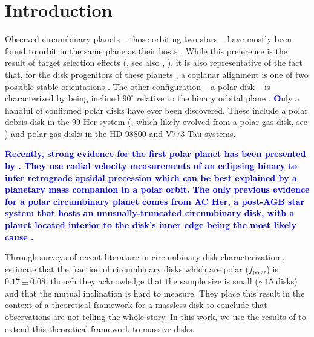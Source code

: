 \documentclass[twocolumn,linenumbers]{aastex631}
\newcommand{\RR}[1]{\textcolor{blue}{\bf#1}} %
\begin{document}

\section{Introduction}
\label{sec:intro}


Observed circumbinary planets -- those orbiting two stars -- have mostly been found to orbit in the same plane as their hosts \citep{doyle2011,orosz2012,welsh2012}. While this preference is the result of target selection effects (\citealt{martin2014}, see also \citealt{martin2015}, \citealt{martin2017a}), it is also representative of the fact that, for the disk progenitors of these planets \citep[from which the planets inherit orbital parameters, see][]{childs2021}, a coplanar alignment is one of two possible stable orientations \citep{bate2000,lubow2000}. The other configuration -- a polar disk -- is characterized by being inclined $90^\circ$ relative to the binary orbital plane \citep{aly2015,martin2017}. \RR{O}nly a handful of confirmed polar disks have ever been discovered. These include a polar debris disk in the 99 Her system (\citealt{kennedy2012}, which likely evolved from a polar gas disk, see \citealt{smallwood2020}) and polar gas disks in the HD 98800 \citep{kennedy2019} and V773 Tau \citep{kenworthy2022} systems.

\RR{Recently, strong evidence for the first polar planet has been presented by \citet{baycroft2025}. They use radial velocity measurements of an eclipsing binary to infer retrograde apsidal precession which can be best explained by a planetary mass companion in a polar orbit.
The only previous evidence for a polar circumbinary planet comes from AC Her, a post-AGB star system that hosts an unusually-truncated circumbinary disk, with a planet located interior to the disk's inner edge being the most likely cause \citep{hillen2015,anugu2023,martin2023}.
}

Through surveys of recent literature in circumbinary disk characterization \citep{czekala2019,zurlo2023}, \citet{ceppi2024} estimate that the fraction of circumbinary disks which are polar ($f_\text{polar}$) is $0.17 \pm 0.08$, though they acknowledge that the sample size is small ($\sim 15$ disks) and that the mutual inclination is hard to measure. They place this result in the context of a theoretical framework for a massless disk \citep{farago2010,lubow2018,zanazzi2018} to conclude that observations are not telling the whole story. In this work, we use the results of \citet{martin2019} to extend this theoretical framework to massive disks.
\end{document}
